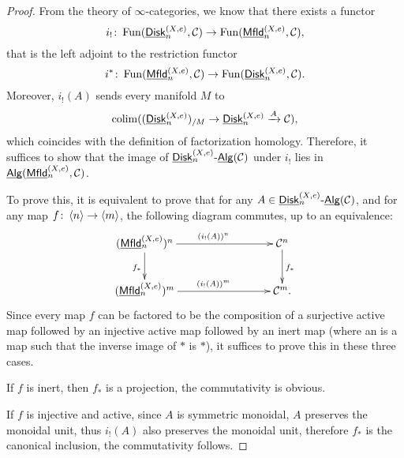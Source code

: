 \documentclass[twoside]{article}
\begin{document}
\begin{proof}
    From the theory of $\infty$-categories, we know that there exists a functor
    $$i_!\colon\operatorname{Fun}(\underline{\smash{\mathsf{Disk}}}_n^{(X,e)},\mathcal C)\to\operatorname{Fun}(\underline{\smash{\mathsf{Mfld}}}_n^{(X,e)},\mathcal C),$$
    that is the left adjoint to the restriction functor $$i^*\colon\operatorname{Fun}(\underline{\smash{\mathsf{Mfld}}}_n^{(X,e)},
    \mathcal C)\to\operatorname{Fun}(\underline{\smash{\mathsf{Disk}}}_n^{(X,e)},\mathcal C).$$ Moreover, $i_!(A)$ sends
    every manifold $M$ to $$\mathop{\operatorname{colim}}((\underline{\smash{\mathsf{Disk}}}_n^{(X,e)})_{/M}\to\underline{\smash{\mathsf{Disk}}}_n^{(X,e)}
    \xrightarrow{A}\cal C),$$ which coincides with the definition of 
    factorization homology. Therefore, it suffices to show that the image of 
    $\underline{\smash{\mathsf{Disk}}}_n^{(X,e)}\text{-}\underline{\smash{\mathsf{Alg}}}(\mathcal C)$ under $i_!$ lies in $\underline{\smash{\mathsf{Alg}}}(\underline{\smash{\mathsf{Mfld}}}_n^{(X,e)},
    \mathcal C)$.

    To prove this, it is equivalent to prove that for any $A\in\underline{\smash{\mathsf{Disk}}}_n^{(X,e)}
    \text{-}\underline{\smash{\mathsf{Alg}}}(\mathcal C)$, and for any map $f\colon\left<n\right>\to\left<m\right>$, the following diagram
    commutes, up to an equivalence: $$\xymatrix{(\Mfld_n^{(X,e)})^n
    \ar[rrr]^{(i_!(A))^n}\ar[d]_{f_*}&&&\mathcal C^n\ar[d]^{f_*}\\
    (\Mfld_n^{(X,e)})^m\ar[rrr]^{(i_!(A))^m}&&&\mathcal C^m.}$$ 
    Since every map $f$ can be factored to be the composition
    of a surjective active map followed by an injective active map followed by
    an inert map (where an  is a map such that the inverse image
    of $*$ is $*$), it suffices to prove this in these three cases.

    If $f$ is inert, then $f_*$ is a projection, the commutativity is obvious.

    If $f$ is injective and active, since $A$ is symmetric monoidal, $A$
    preserves the monoidal unit, thus $i_!(A)$ also preserves the monoidal unit,
    therefore $f_*$ is the canonical inclusion, the commutativity follows.


\end{proof}
\end{document}
